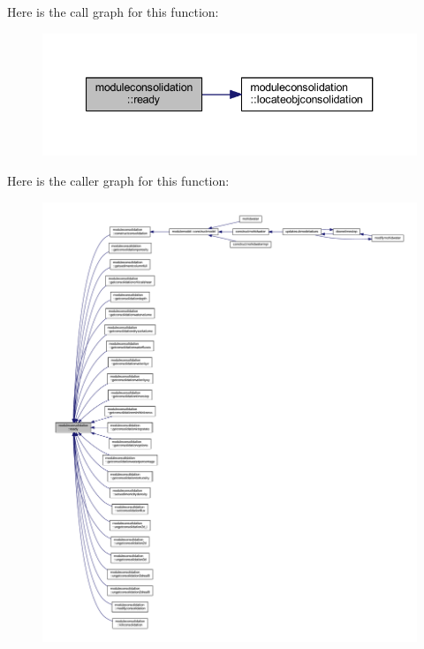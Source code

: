 Here is the call graph for this function\+:\nopagebreak
\begin{figure}[H]
\begin{center}
\leavevmode
\includegraphics[width=340pt]{namespacemoduleconsolidation_ab6b8d86bedc5c2870f1fb998c297005e_cgraph}
\end{center}
\end{figure}
Here is the caller graph for this function\+:\nopagebreak
\begin{figure}[H]
\begin{center}
\leavevmode
\includegraphics[width=350pt]{namespacemoduleconsolidation_ab6b8d86bedc5c2870f1fb998c297005e_icgraph}
\end{center}
\end{figure}
\mbox{\label{namespacemoduleconsolidation_a40ac455c6e9cb9d5dfa436553c29c193}} 
